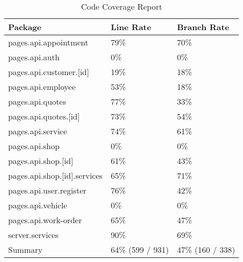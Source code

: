 \documentclass[12pt, titlepage]{article}
\begin{document}
\begin{table}[H]
	\centering
	\caption{Code Coverage Report} \label{Code Coverage Report}
	\begin{tabular}{|l|l|l|}
		\hline
		\textbf{Package}             & \textbf{Line Rate} & \textbf{Branch Rate} \\
		\hline
		pages.api.appointment        & 79\%               & 70\%                 \\
		\hline
		pages.api.auth               & 0\%                & 0\%                  \\
		\hline
		pages.api.customer.[id]      & 19\%               & 18\%                 \\
		\hline
		pages.api.employee           & 53\%               & 18\%                 \\
		\hline
		pages.api.quotes             & 77\%               & 33\%                 \\
		\hline
		pages.api.quotes.[id]        & 73\%               & 54\%                 \\
		\hline
		pages.api.service            & 74\%               & 61\%                 \\
		\hline
		pages.api.shop               & 0\%                & 0\%                  \\
		\hline
		pages.api.shop.[id]          & 61\%               & 43\%                 \\
		\hline
		pages.api.shop.[id].services & 65\%               & 71\%                 \\
		\hline
		pages.api.user.register      & 76\%               & 42\%                 \\
		\hline
		pages.api.vehicle            & 0\%                & 0\%                  \\
		\hline
		pages.api.work-order         & 65\%               & 47\%                 \\
		\hline
		server.services              & 90\%               & 69\%                 \\
		\hline
		Summary                      & 64\% (599 / 931)   & 47\% (160 / 338)     \\
		\hline
	\end{tabular}
\end{table}

\newpage





\newpage
\end{document}
